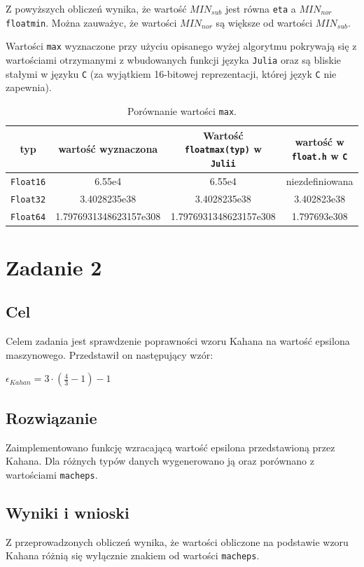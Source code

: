 \documentclass{article}
\begin{document}
\newpage 

Z powyższych obliczeń wynika, że wartość $MIN_{sub}$ jest równa \texttt{eta} a $MIN_{nor}$ \texttt{floatmin}. Można zauważyc, że wartości $MIN_{nor}$ są większe od wartości $MIN_{sub}$.

Wartości \texttt{max} wyznaczone przy użyciu opisanego wyżej algorytmu pokrywają się z wartościami otrzymanymi z wbudowanych funkcji języka \texttt{Julia} oraz są bliskie stałymi w języku \texttt{C} (za wyjątkiem 16-bitowej reprezentacji, której język \texttt{C} nie zapewnia).

\begin{table}[h!]
    \centering
    \begin{tabular}{ |c|c|c|c| } 
    \hline
    typ & wartość wyznaczona & Wartość \texttt{floatmax(typ)} w \texttt{Julii} & wartość w \texttt{float.h} w \texttt{C} \\ 
    \hline
    \texttt{Float16} & 6.55e4 & 6.55e4 & niezdefiniowana \\ 
    \hline
    \texttt{Float32} & 3.4028235e38 & 3.4028235e38 & 3.402823e38 \\ 
    \hline
    \texttt{Float64} & 1.7976931348623157e308 & 1.7976931348623157e308 & 1.797693e308 \\ 
    \hline
    \end{tabular}
    \caption{Porównanie wartości \texttt{max}.}
\end{table}

\section{Zadanie 2}
\subsection{Cel}
Celem zadania jest sprawdzenie poprawności wzoru Kahana na wartość epsilona maszynowego. Przedstawił on następujący wzór:
\begin{center}
    $\epsilon_{Kahan} = 3 \cdot (\frac{4}{3} - 1) - 1$
\end{center}

\subsection{Rozwiązanie}
Zaimplementowano funkcję wzracającą wartość epsilona przedstawioną przez Kahana. Dla różnych typów danych wygenerowano ją oraz porównano z wartościami \texttt{macheps}. 

\subsection{Wyniki i wnioski}
Z przeprowadzonych obliczeń wynika, że wartości obliczone na podstawie wzoru Kahana różnią się wyłącznie znakiem od wartości \texttt{macheps}.
\end{document}

